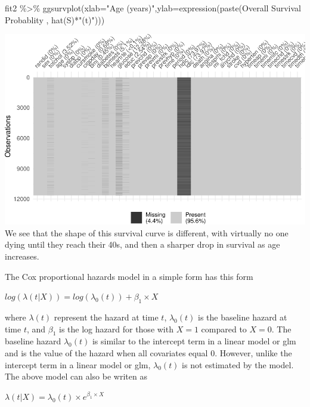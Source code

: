 \documentclass[
]{book}
\newenvironment{Shaded}{\begin{snugshade}}{\end{snugshade}}
\newcommand{\AttributeTok}[1]{\textcolor[rgb]{0.77,0.63,0.00}{#1}}
\newcommand{\FunctionTok}[1]{\textcolor[rgb]{0.00,0.00,0.00}{#1}}
\newcommand{\NormalTok}[1]{#1}
\newcommand{\SpecialCharTok}[1]{\textcolor[rgb]{0.00,0.00,0.00}{#1}}
\newcommand{\StringTok}[1]{\textcolor[rgb]{0.31,0.60,0.02}{#1}}
\begin{document}
\begin{Shaded}
\begin{Highlighting}[]
\NormalTok{fit2 }\SpecialCharTok{\%\textgreater{}\%}
\FunctionTok{ggsurvplot}\NormalTok{(}\AttributeTok{xlab=}\StringTok{"Age (years)"}\NormalTok{,}\AttributeTok{ylab=}\FunctionTok{expression}\NormalTok{(}\FunctionTok{paste}\NormalTok{(}\StringTok{\textquotesingle{}Overall Survival Probablity \textquotesingle{}}\NormalTok{, }\FunctionTok{hat}\NormalTok{(S)}\SpecialCharTok{*}\StringTok{"(t)"}\NormalTok{)))}
\end{Highlighting}
\end{Shaded}

\includegraphics{adv_epi_analysis_files/figure-latex/unnamed-chunk-96-1.pdf}
We see that the shape of this survival curve is different, with virtually no one dying until they reach their 40s, and then a sharper drop in survival as age increases.

The Cox proportional hazards model in a simple form has this form

\(log(\lambda(t|X))=log(\lambda_{0}(t))+\beta_{1}\times X\)

where \(\lambda(t)\) represent the hazard at time \(t\), \(\lambda_{0}(t)\) is the baseline hazard at time \(t\), and \(\beta_{1}\) is the log hazard for those with \(X=1\) compared to \(X=0\). The baseline hazard \(\lambda_{0}(t)\) is similar to the intercept term in a linear model or glm and is the value of the hazard when all covariates equal 0. However, unlike the intercept term in a linear model or glm, \(\lambda_{0}(t)\) is not estimated by the model.
The above model can also be writen as

\(\lambda(t|X)=\lambda_{0}(t)\times e^{\beta_{1}\times X}\)
\end{document}
